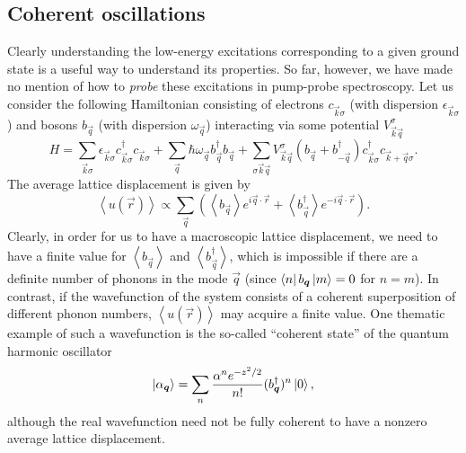 \subsection{Coherent oscillations}\label{sec:coherentoscillations}

Clearly understanding the low-energy excitations corresponding to a given ground state is a useful way to understand its properties.
So far, however, we have made no mention of how to \emph{probe} these excitations in pump-probe spectroscopy.
Let us consider the following Hamiltonian consisting of electrons $c_{\vec{k}\sigma}$ (with dispersion $\epsilon_{\vec{k}\sigma}$) and bosons $b_{\vec{q}}$ (with dispersion $\omega_{\vec{q}}$) interacting via some potential $V^\sigma_{\vec{k}\vec{q}}$
\begin{equation}\label{eq:electronlatticehamiltonian}
H = \sum_{\vec{k}\sigma}\epsilon_{\vec{k}\sigma}c^\dagger_{\vec{k}\sigma}c_{\vec{k}\sigma}
+\sum_{\vec{q}}\hbar \omega_{\vec{q}}b^\dagger_{\vec{q}}b_{\vec{q}}
+\sum_{\sigma\vec{k}\vec{q}}V^\sigma_{\vec{k}\vec{q}}\left(b_{\vec{q}}+b^\dagger_{-\vec{q}}\right)c^\dagger_{\vec{k}\sigma}c_{\vec{k}+\vec{q}\sigma}.
\end{equation}
The average lattice displacement is given by
\begin{equation}
\left<u(\vec{r})\right> \propto \sum_{\vec{q}}\left(\left<b_{\vec{q}}\right>e^{i\vec{q}\cdot\vec{r}}+\left<b^\dagger_{\vec{q}}\right>e^{-i\vec{q}\cdot\vec{r}}\right).
\end{equation}
Clearly, in order for us to have a macroscopic lattice displacement, we need to have a finite value for $\left<b_{\vec{q}}\right>$ and $\left<b^\dagger_{\vec{q}}\right>$, which is impossible if there are a definite number of phonons in the mode $\vec{q}$ (since $\bra{n}b_{\bm{q}}\ket{m}=0$ for $n=m$).
In contrast, if the wavefunction of the system consists of a coherent superposition of different phonon numbers, $\left<u(\vec{r})\right>$ may acquire a finite value.
One thematic example of such a wavefunction is the so-called ``coherent state'' of the quantum harmonic oscillator
\begin{equation}\label{eq:coherentstate}
\ket{\alpha_{\bm{q}}} = \sum_n \frac{\alpha^ne^{-z^2/2}}{n!}(b^\dagger_{\bm{q}})^n\ket{0},
\end{equation}
although the real wavefunction need not be fully coherent to have a nonzero average lattice displacement.

